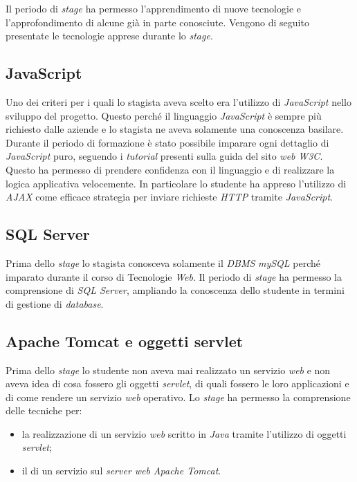 Il periodo di \textit{stage} ha permesso l'apprendimento di nuove tecnologie e l'approfondimento di alcune già in parte conosciute. Vengono di seguito presentate le tecnologie apprese durante lo \textit{stage}.

\subsection{JavaScript}

Uno dei criteri per i quali lo stagista aveva scelto \visione{} era l'utilizzo di \textit{JavaScript} nello sviluppo del progetto. Questo perché il linguaggio \textit{JavaScript} è sempre più richiesto dalle aziende e lo stagista ne aveva solamente una conoscenza basilare. Durante il periodo di formazione è stato possibile imparare ogni dettaglio di \textit{JavaScript} puro, seguendo i \textit{tutorial} presenti sulla guida del sito \textit{web} \textit{W3C}. Questo ha permesso di prendere confidenza con il linguaggio e di realizzare la logica applicativa velocemente. In particolare lo studente ha appreso l'utilizzo di \textit{AJAX} come efficace strategia per inviare richieste \textit{HTTP} tramite \textit{JavaScript}.

\subsection{SQL Server}

Prima dello \textit{stage} lo stagista conosceva solamente il \textit{DBMS} \textit{mySQL} perché imparato durante il corso di Tecnologie \textit{Web}. Il periodo di \textit{stage} ha permesso la comprensione di \textit{SQL Server}, ampliando la conoscenza dello studente in termini di gestione di \textit{database}.

\subsection{Apache Tomcat e oggetti servlet}

Prima dello \textit{stage} lo studente non aveva mai realizzato un servizio \textit{web} e non aveva idea di cosa fossero gli oggetti \textit{servlet}, di quali fossero le loro applicazioni e di come rendere un servizio \textit{web} operativo. Lo \textit{stage} ha permesso la comprensione delle tecniche per:
\begin{itemize}
	\item la realizzazione di un servizio \textit{web} scritto in \textit{Java} tramite l'utilizzo di oggetti \textit{servlet};
	\item il  di un servizio sul \textit{server web} \textit{Apache Tomcat}.
\end{itemize}

